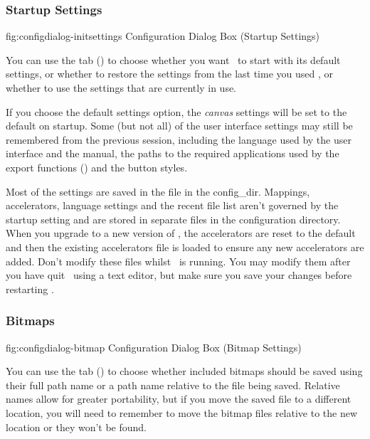\subsubsection{Startup Settings}\label{sec:initsettings}


\FloatFig
  {fig:configdialog-initsettings}
  {}
  {Configuration Dialog Box (Startup Settings)}

You can use the  tab
()
to choose whether you want \FlowframTk\ to start with its
default settings, or whether to restore the settings from the last
time you used \FlowframTk, or whether to use the settings that are
currently in use.

If you choose the default settings option, the \emph{\gls{canvas}}
settings will be set to the default on startup.  Some (but not all)
of the user interface settings may still be remembered from the
previous session, including the language used by the user interface
and the manual, the paths to the required applications used by the
export functions () and the button styles.

Most of the settings are saved in the file  in the
\gls{config_dir}.  Mappings,
accelerators, language settings and the recent file list aren't
governed by the startup setting and are stored in separate files in
the configuration directory. When you upgrade to a new version of
\FlowframTk, the accelerators are reset to the default and then the
existing accelerators file is loaded to ensure any new accelerators
are added. Don't modify these files whilst \FlowframTk\ is running.
You may modify them after you have quit \FlowframTk\ using a text
editor, but make sure you save your changes before restarting
\FlowframTk.


\subsubsection{Bitmaps}\label{sec:bitmapconfig}


\FloatFig
  {fig:configdialog-bitmap}
  {}
  {Configuration Dialog Box (Bitmap Settings)}

You can use the  tab
()
to choose whether included \glspl{bitmap} should be
saved using their full path name or a path name relative to the
file being saved. Relative names allow for greater portability, but
if you move the saved file to a different location, you will need to
remember to move the bitmap files relative to the new location or
they won't be found.

